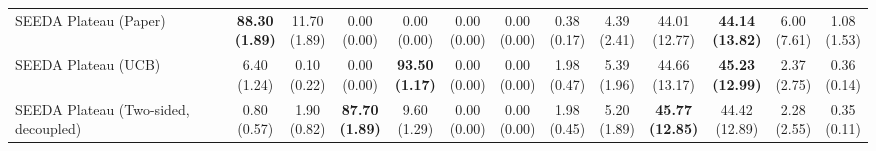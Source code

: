\begin{table}[H]
{\begin{tabular}{l|cccccc|cccccc}
SEEDA Plateau (Paper) & \bfseries \makecell{88.30 \\ (1.89)} & \makecell{11.70 \\ (1.89)} & {\cellcolor[HTML]{C8E6C9}} \makecell{0.00 \\ (0.00)} & \makecell{0.00 \\ (0.00)} & \makecell{0.00 \\ (0.00)} & \makecell{0.00 \\ (0.00)} & \makecell{0.38 \\ (0.17)} & \makecell{4.39 \\ (2.41)} & {\cellcolor[HTML]{C8E6C9}} \makecell{44.01 \\ (12.77)} & \bfseries \makecell{44.14 \\ (13.82)} & \makecell{6.00 \\ (7.61)} & \makecell{1.08 \\ (1.53)} \\
SEEDA Plateau (UCB) & \makecell{6.40 \\ (1.24)} & \makecell{0.10 \\ (0.22)} & {\cellcolor[HTML]{C8E6C9}} \makecell{0.00 \\ (0.00)} & \bfseries \makecell{93.50 \\ (1.17)} & \makecell{0.00 \\ (0.00)} & \makecell{0.00 \\ (0.00)} & \makecell{1.98 \\ (0.47)} & \makecell{5.39 \\ (1.96)} & {\cellcolor[HTML]{C8E6C9}} \makecell{44.66 \\ (13.17)} & \bfseries \makecell{45.23 \\ (12.99)} & \makecell{2.37 \\ (2.75)} & \makecell{0.36 \\ (0.14)} \\
SEEDA Plateau (Two-sided, decoupled) & \makecell{0.80 \\ (0.57)} & \makecell{1.90 \\ (0.82)} & {\cellcolor[HTML]{C8E6C9}} \bfseries \makecell{87.70 \\ (1.89)} & \makecell{9.60 \\ (1.29)} & \makecell{0.00 \\ (0.00)} & \makecell{0.00 \\ (0.00)} & \makecell{1.98 \\ (0.45)} & \makecell{5.20 \\ (1.89)} & {\cellcolor[HTML]{C8E6C9}} \bfseries \makecell{45.77 \\ (12.85)} & \makecell{44.42 \\ (12.89)} & \makecell{2.28 \\ (2.55)} & \makecell{0.35 \\ (0.11)} \\

\end{tabular}}
\end{table}
